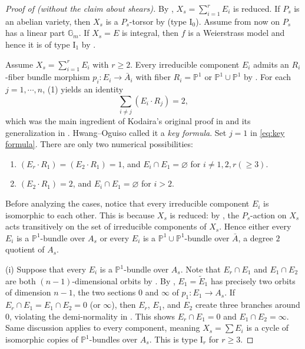 \documentclass[reqno, letterpaper]{amsart}
\numberwithin{equation}{subsection}
\let\emptyset\varnothing
\let\to\longrightarrow
\newcommand{\GG}{\mathbb{G}}
\newcommand{\PP}{\mathbb{P}}
\begin{document}
		\begin{proof}[Proof of  (without the claim about shears)]
			By , $X_s = \sum_{i=1}^r E_i$ is reduced. If $P_s$ is an abelian variety, then $X_s$ is a $P_s$-torsor by  (type $\mathrm I_0$). Assume from now on $P_s$ has a linear part $\GG_m$. If $X_s = E$ is integral, then $f$ is a Weierstrass model and hence it is of type $\mathrm I_1$ by .
			
			\medskip
			
			Assume $X_s = \sum_{i=1}^r E_i$ with $r \ge 2$. Every irreducible component $E_i$ admits an $R_i$-fiber bundle morphism $p_i : E_i \to \bar A_i$ with fiber $R_i = \PP^1$ or $\PP^1 \cup \PP^1$ by . For each $j = 1, \cdots, n$, (1) yields an identity
			\begin{equation} \label{eq:key formula}
				\sum_{i \neq j} (E_i \cdot R_j) = 2 ,
			\end{equation}
			which was the main ingredient of Kodaira's original proof in \cite[Theorem~6.2, (6.5)]{kod63} and its generalization in \cite[Proposition~4.10--4.12]{hwang-ogu09}. Hwang--Oguiso called it a \emph{key formula}. Set $j = 1$ in \eqref{eq:key formula}. There are only two numerical possibilities:
			\begin{enumerate}[label=\textnormal{(\roman*)}]
				\item $(E_r \cdot R_1) = (E_2 \cdot R_1) = 1$, and $E_i \cap E_1 = \emptyset$ for $i \neq 1, 2, r (\ge 3)$.
				\item $(E_2 \cdot R_1) = 2$, and $E_i \cap E_1 = \emptyset$ for $i > 2$.
			\end{enumerate}
			Before analyzing the cases, notice that every irreducible component $E_i$ is isomorphic to each other. This is because $X_s$ is reduced: by , the $P_s$-action on $X_s$ acts transitively on the set of irreducible components of $X_s$. Hence either every $E_i$ is a $\PP^1$-bundle over $A_s$ or every $E_i$ is a $\PP^1 \cup \PP^1$-bundle over $\bar A$, a degree $2$ quotient of $A_s$.
			
			\medskip
			
			(i) Suppose that every $E_i$ is a $\PP^1$-bundle over $A_s$. Note that $E_r \cap E_1$ and $E_1 \cap E_2$ are both $(n-1)$-dimensional orbits by . By , $E_1 = \tilde E_1$ has precisely two orbits of dimension $n-1$, the two sections $0$ and $\infty$ of $p_1 : E_1 \to A_s$. If $E_r \cap E_1 = E_1 \cap E_2 = 0$ (or $\infty$), then $E_r$, $E_1$, and $E_2$ create three branches around $0$, violating the demi-normality in . This shows $E_r \cap E_1 = 0$ and $E_1 \cap E_2 = \infty$. Same discussion applies to every component, meaning $X_s = \sum E_i$ is a cycle of isomorphic copies of $\PP^1$-bundles over $A_s$. This is type $\mathrm I_r$ for $r \ge 3$.
			

\end{proof}
\end{document}
